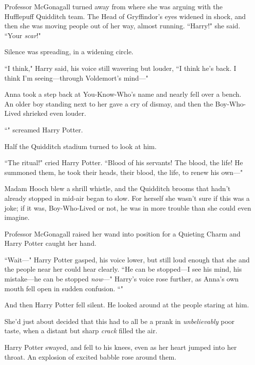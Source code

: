 Professor McGonagall turned away from where she was arguing with the Hufflepuff Quidditch team. The Head of Gryffindor's eyes widened in shock, and then she was moving people out of her way, almost running. ``Harry!" she said. ``Your \emph{scar}!"

Silence was spreading, in a widening circle.

``I think," Harry said, his voice still wavering but louder, ``I think he's back. I think I'm seeing—through Voldemort's mind—"

Anna took a step back at You-Know-Who's name and nearly fell over a bench. An older boy standing next to her gave a cry of dismay, and then the Boy-Who-Lived shrieked even louder.

``" screamed Harry Potter.

Half the Quidditch stadium turned to look at him.

``The ritual!" cried Harry Potter. ``Blood of his servants! The blood, the life! He summoned them, he took their heads, their blood, the life, to renew his own—"

Madam Hooch blew a shrill whistle, and the Quidditch brooms that hadn't already stopped in mid-air began to slow. For herself she wasn't sure if this was a joke; if it was, Boy-Who-Lived or not, he was in more trouble than she could even imagine.

Professor McGonagall raised her wand into position for a Quieting Charm and Harry Potter caught her hand.

``Wait—" Harry Potter gasped, his voice lower, but still loud enough that she and the people near her could hear clearly. ``He can be stopped—I see his mind, his mistake—he can be stopped \emph{now}—" Harry's voice rose further, as Anna's own mouth fell open in sudden confusion. ``"

And then Harry Potter fell silent. He looked around at the people staring at him.

She'd just about decided that this had to all be a prank in \emph{unbelievably} poor taste, when a distant but sharp \emph{crack} filled the air.

Harry Potter swayed, and fell to his knees, even as her heart jumped into her throat. An explosion of excited babble rose around them.

